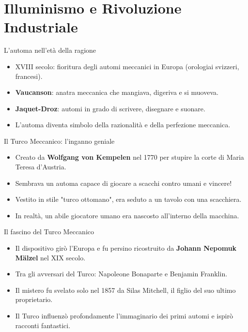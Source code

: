 \documentclass{beamer}
\begin{document}
\section{Illuminismo e Rivoluzione Industriale}
%
%
\begin{frame}{L'automa nell'età della ragione}
  \begin{itemize}
    \item XVIII secolo: fioritura degli automi meccanici in Europa (orologiai svizzeri, francesi).
    \item \textbf{Vaucanson}: anatra meccanica che mangiava, digeriva e si muoveva.
    \item \textbf{Jaquet-Droz}: automi in grado di scrivere, disegnare e suonare.
    \item L'automa diventa simbolo della razionalità e della perfezione meccanica.
  \end{itemize}
\end{frame}
%
%
\begin{frame}{Il Turco Meccanico: l'inganno geniale}
  \begin{itemize}
    \item Creato da \textbf{Wolfgang von Kempelen} nel 1770 per stupire la corte di Maria Teresa d’Austria.
    \item Sembrava un automa capace di giocare a scacchi contro umani e vincere!
    \item Vestito in stile "turco ottomano", era seduto a un tavolo con una scacchiera.
    \item In realtà, un abile giocatore umano era nascosto all’interno della macchina.
  \end{itemize}
\end{frame}
%
%
\begin{frame}{Il fascino del Turco Meccanico}
  \begin{itemize}
    \item Il dispositivo girò l’Europa e fu persino ricostruito da \textbf{Johann Nepomuk Mälzel} nel XIX secolo.
    \item Tra gli avversari del Turco: Napoleone Bonaparte e Benjamin Franklin.
    \item Il mistero fu svelato solo nel 1857 da Silas Mitchell, il figlio del suo ultimo proprietario.
    \item Il Turco influenzò profondamente l’immaginario dei primi automi e ispirò racconti fantastici.
  \end{itemize}
\end{frame}
%
\end{document}
